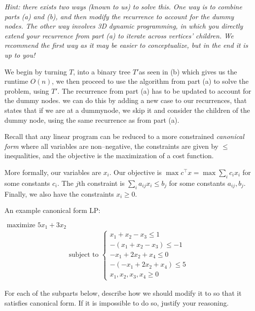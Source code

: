 \documentclass[11pt]{article}
\begin{document}
\begin{subparts}
    \emph{Hint: there exists two ways (known to us) to solve this. One way is to combine parts (a) and (b), and then modify the recurrence to account for the dummy nodes. The other way involves 3D dynamic programming, in which you directly extend your recurrence from part (a) to iterate across vertices' children. We recommend the first way as it may be easier to conceptualize, but in the end it is up to you!}\\
    \begin{solution}
        We begin by turning $T$, into a binary tree $T'$as seen in (b) which gives us the runtime $O(n)$, we then proceed to use the algorithm
        from part (a) to solve the problem, using $T'$. The recurrence from part (a) has to be updated to account for 
        the dummy nodes. we can do this by adding a new case to our recurrences, that states that if we are at a dummynode, we skip it and
        consider the children of the dummy node, using the same recurrence as from part (a). 
    \end{solution}
\end{subparts}

\newpage

Recall that any linear program can be reduced to a more constrained \emph{canonical form} where all variables are non--negative, the constraints are given by $\leq$ inequalities, and the objective is the maximization of a cost function. 

\noindent More formally, our variables are $x_i$. Our objective is $\max c^\top x = \max \sum_i c_i x_i$ for some constants $c_i$. The $j$th constraint is  $\sum_i a_{ij} x_i \leq b_j$ for some constants $a_{ij}, b_j$. Finally, we also have the constraints $x_i \geq 0$.

\noindent An example canonical form LP: 
\begin{center}
$\mbox{ maximize } 5x_1 + 3x_2$
\begin{align*}
\text{subject to } \begin{cases} x_1 + x_2 - x_3 \leq 1 \\
-(x_1 + x_2 - x_3) \leq -1 \\
-x_1 + 2x_2 + x_4 \leq 0 \\ 
-(-x_1 + 2x_2 + x_4) \leq 5 \\
x_1, x_2, x_3, x_4 \ge 0
\end{cases}
\end{align*}
\end{center} 

\noindent For each of the subparts below, describe how we should modify it to so that it satisfies canonical form. If it is impossible to do so, justify your reasoning. 
\end{document}
